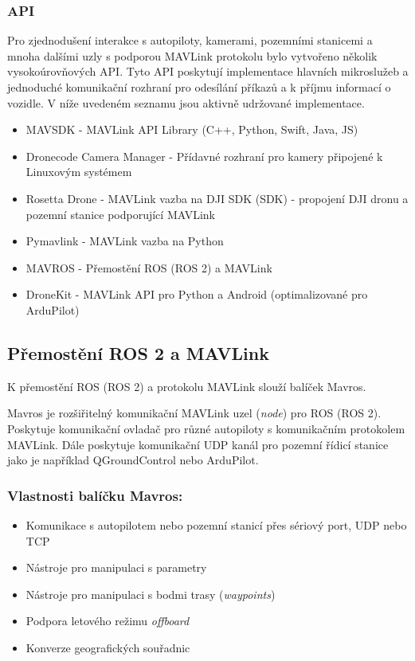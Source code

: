 \subsubsection{API}

Pro zjednodušení interakce s autopiloty, kamerami, pozemními stanicemi a mnoha dalšími uzly s podporou MAVLink protokolu bylo vytvořeno několik vysokoúrovňových \acs{API}. Tyto \acs{API} poskytují implementace hlavních mikroslužeb a jednoduché komunikační rozhraní pro odesílání příkazů a k příjmu informací o vozidle. V níže uvedeném seznamu jsou aktivně udržované implementace.

\begin{itemize}
    \item MAVSDK - MAVLink API Library (C++, Python, Swift, Java, JS) 
    \item Dronecode Camera Manager - Přídavné rozhraní pro kamery připojené k Linuxovým systémem
    \item Rosetta Drone - MAVLink vazba na DJI \acs{SDK} (\acl{SDK}) - propojení DJI dronu a pozemní stanice podporující MAVLink
    \item Pymavlink - MAVLink vazba na Python
    \item MAVROS - Přemostění ROS (ROS 2) a MAVLink
    \item DroneKit - MAVLink API pro Python a Android (optimalizované pro ArduPilot)
\end{itemize}

\subsection{Přemostění ROS 2 a MAVLink}

K přemostění ROS (ROS 2) a protokolu MAVLink slouží balíček Mavros. \cite{MAVROS}

Mavros je rozšiřitelný komunikační MAVLink uzel (\textit{node}) pro ROS (ROS 2). Poskytuje komunikační ovladač pro různé autopiloty s komunikačním protokolem MAVLink. Dále poskytuje komunikační UDP kanál pro pozemní řídicí stanice jako je například QGroundControl nebo ArduPilot.

\subsubsection{Vlastnosti balíčku Mavros:}

\begin{itemize}
    \item Komunikace s autopilotem nebo pozemní stanicí přes sériový port, UDP nebo TCP
    \item Nástroje pro manipulaci s parametry
    \item Nástroje pro manipulaci s bodmi trasy (\textit{waypoints})
    \item Podpora letového režimu \textit{offboard}
    \item Konverze geografických souřadnic
\end{itemize}

